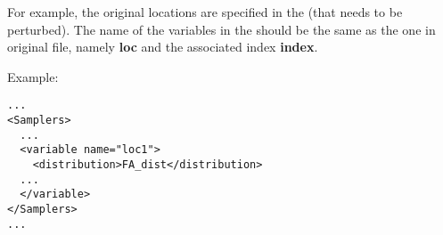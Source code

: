 For example, the original locations are specified in the  (that needs to be perturbed).
The name of the variables in the  should be the same as the one in original 
file, namely \textbf{loc} and the associated index \textbf{index}.

Example:
\begin{lstlisting}[style=XML]
...
<Samplers>
  ...
  <variable name="loc1">
    <distribution>FA_dist</distribution>
  ...
  </variable>
</Samplers>
...
\end{lstlisting}

